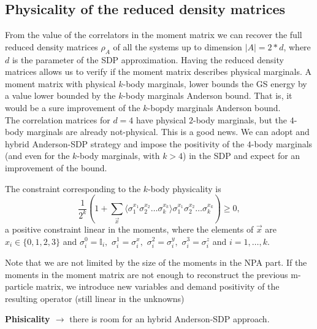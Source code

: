 \documentclass[10pt,a4paper,twoside,twocolumn]{revtex4-1}
\begin{document}
  
\subsection{Physicality of the reduced density matrices}
 From the value of the correlators in the moment matrix we can recover the full reduced density matrices $\rho_A$ of all the systems up to dimension $|A|=2*d$, where $d$ is the parameter of the SDP approximation.
 Having the reduced density matrices allows us to verify if the moment matrix describes physical marginals. A moment matrix with physical $k$-body marginals, lower bounds the GS energy by a value lower bounded by the $k$-body marginals Anderson bound. That is, it would be a sure improvement of the $k$-bopdy marginals Anderson bound.\\
 The correlation matrices for $d=4$ have physical $2$-body marginals, but the $4$-body marginals are already not-physical. This is a good news. We can adopt and hybrid Anderson-SDP strategy and impose the positivity of the $4$-body marginals (and even for the $k$-body marginals, with $k>4$) in the SDP and expect for an improvement of the bound.
 
The constraint corresponding to the $k$-body physicality is
\begin{equation}
\frac{1}{2^k} \left( 1 + \sum_{\vec{x}} \langle \sigma^{x_1}_{1}\sigma^{x_2}_{2}\dots \sigma^{x_k}_{k}\rangle \sigma^{x_1}_{1}\sigma^{x_2}_{2}\dots \sigma^{x_k}_{k}\right) \geq 0 ,
\end{equation}
a positive constraint linear in the moments,  where the elements of $\vec{x}$ are $x_i \in \{0,1,2,3\}$ and $\sigma^{0}_{i}=\mathbb{I}_{i},$ $\sigma^{1}_{i}=\sigma^{x}_{i},$ $\sigma^{2}_{i}=\sigma^{y}_{i},$ $\sigma^{3}_{i}=\sigma^{z}_{i}$ and $i=1,\dots ,k$.

Note that we are not limited by the size of the moments in the NPA part. If the moments in the moment matrix are not enough to reconstruct the previous m-particle matrix, we introduce new variables and demand positivity of the resulting operator (still linear in the unknowns)

 
 \textbf{Phisicality $\rightarrow$} there is room for an hybrid Anderson-SDP approach. 
 
 
 
\end{document}
